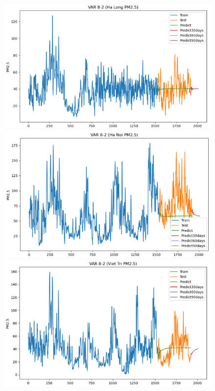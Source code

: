 \begin{figure}[H]
\begin{minipage}{0.15\textwidth}
        \end{minipage}
        \hfill

    \begin{minipage}{0.15\textwidth}
        \centering
        \includegraphics[width=1\textwidth]{img/final/VAR/90D/VAR_8_2_HL.png}
        \end{minipage}
        \hfill
        \begin{minipage}{0.15\textwidth}
        \centering
        \includegraphics[width=1\textwidth]{img/final/VAR/90D/VAR_8_2_HN.png}
        \end{minipage}
        \hfill
        \begin{minipage}{0.15\textwidth}
        \centering
        \includegraphics[width=1\textwidth]{img/final/VAR/90D/VAR_8_2_VT.png}

\end{minipage}
\end{figure}
